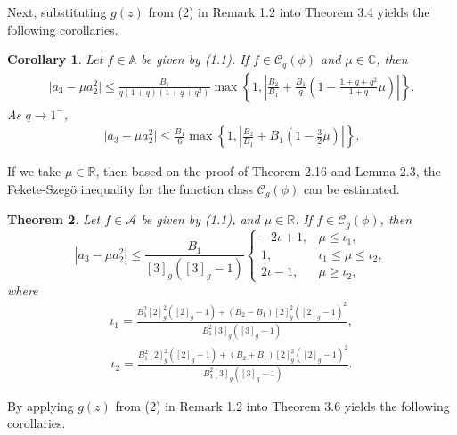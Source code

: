 \documentclass[11pt,twoside, reqno]{article}
\newtheorem{theorem}{Theorem}[section]
\newtheorem{corollary}[theorem]{Corollary}
\theoremstyle{definition}
\begin{document}
Next, substituting $g(z)$ from (2) in Remark 1.2 into Theorem 3.4 yields the following corollaries.
\begin{corollary}
Let $f\in \mathbb{A} $ be given by (1.1). If $f\in\mathcal{C}_{q}(\phi)$ and $\mu \in \mathbb{C}$, then
\begin{align}\nonumber
\mid a_3-\mu a_2^2\mid\leq \frac{B_{1}}{q(1+q)(1+q+q^{2})}\max\left\{1,\left|\frac{B_{2}}{B_{1}}+
\frac{B_{1}}{q}\left(1-\frac{1+q+q^{2}}{1+q}\mu\right)\right|\right\}.
\end{align}
As $q\rightarrow1^{-}$,
\begin{align}\nonumber
\mid a_3-\mu a_2^2\mid\leq \frac{B_{1}}{6}\max\left\{1,\left|\frac{B_{2}}{B_{1}}+
B_{1}\left(1-\frac{3}{2}\mu\right)\right|\right\}.
\end{align}
\end{corollary}
If we take $\mu \in \mathbb{R}$, then based on the proof of Theorem 2.16 and Lemma 2.3, the Fekete-Szeg\"{o} inequality for the function class $\mathcal{C}_{g}(\phi)$ can be estimated.
\begin{theorem}
Let $f \in \mathcal{A}$ be given by (1.1), and $\mu \in \mathbb{R}$. If $f \in \mathcal{C}_{g}(\phi)$, then
\begin{equation*}
\left|a_{3} - \mu a_{2}^{2}\right| \leq \frac{B_{1}}{[3]_{g}([3]_{g}-1)}
\begin{cases}
-2\iota + 1, & \mu \leq \iota_{1}, \\
1, &  \iota_{1} \leq \mu \leq \iota_{2}, \\
2\iota - 1, &  \mu \geq \iota_{2},
\end{cases}
\end{equation*}
where
\begin{align}\nonumber
\iota_{1}=\frac{B_{1}^{2}[2]_{g}^{2}([2]_{g}-1)+(B_{2}-B_{1})[2]_{g}^{2}([2]_{g}-1)^{2}}{B_{1}^{2}[3]_{g}([3]_{g}-1)},
\end{align}
\begin{align}\nonumber
\iota_{2}=\frac{B_{1}^{2}[2]_{g}^{2}([2]_{g}-1)+(B_{2}+B_{1})[2]_{g}^{2}([2]_{g}-1)^{2}}{B_{1}^{2}[3]_{g}([3]_{g}-1)}.
\end{align}
\end{theorem}
By applying $g(z)$ from (2) in Remark 1.2 into Theorem 3.6 yields the following corollaries.
\end{document}

